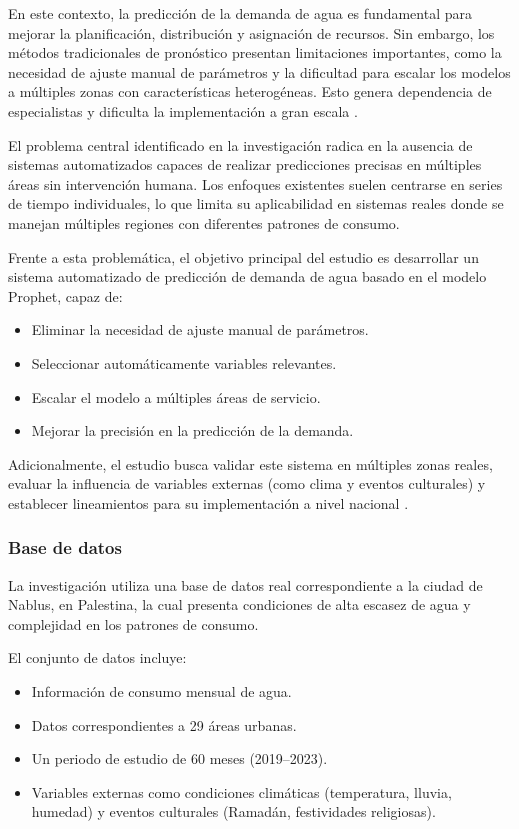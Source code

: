 En este contexto, la predicción de la demanda de agua es fundamental para mejorar la planificación, distribución y asignación de recursos. Sin embargo, los métodos tradicionales de pronóstico presentan limitaciones importantes, como la necesidad de ajuste manual de parámetros y la dificultad para escalar los modelos a múltiples zonas con características heterogéneas. Esto genera dependencia de especialistas y dificulta la implementación a gran escala \cite{ref_agua}.

El problema central identificado en la investigación radica en la ausencia de sistemas automatizados capaces de realizar predicciones precisas en múltiples áreas sin intervención humana. Los enfoques existentes suelen centrarse en series de tiempo individuales, lo que limita su aplicabilidad en sistemas reales donde se manejan múltiples regiones con diferentes patrones de consumo.

Frente a esta problemática, el objetivo principal del estudio es desarrollar un sistema automatizado de predicción de demanda de agua basado en el modelo Prophet, capaz de:

\begin{itemize}
    \item Eliminar la necesidad de ajuste manual de parámetros.
    \item Seleccionar automáticamente variables relevantes.
    \item Escalar el modelo a múltiples áreas de servicio.
    \item Mejorar la precisión en la predicción de la demanda.
\end{itemize}

Adicionalmente, el estudio busca validar este sistema en múltiples zonas reales, evaluar la influencia de variables externas (como clima y eventos culturales) y establecer lineamientos para su implementación a nivel nacional \cite{ref_agua}.

\subsubsection{Base de datos}

La investigación utiliza una base de datos real correspondiente a la ciudad de Nablus, en Palestina, la cual presenta condiciones de alta escasez de agua y complejidad en los patrones de consumo.

El conjunto de datos incluye:

\begin{itemize}
    \item Información de consumo mensual de agua.
    \item Datos correspondientes a 29 áreas urbanas.
    \item Un periodo de estudio de 60 meses (2019--2023).
    \item Variables externas como condiciones climáticas (temperatura, lluvia, humedad) y eventos culturales (Ramadán, festividades religiosas).
\end{itemize}

